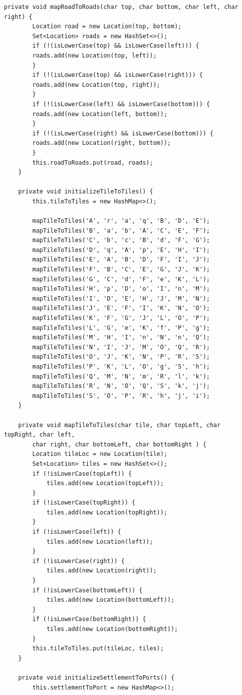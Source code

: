 \documentclass{fank1basedocument}
\begin{document}
\begin{lstlisting}[style=javacode,language=myJava]
	private void mapRoadToRoads(char top, char bottom, char left, char right) {
		Location road = new Location(top, bottom);
		Set<Location> roads = new HashSet<>();
		if (!(isLowerCase(top) && isLowerCase(left))) {
		roads.add(new Location(top, left));
		}
		if (!(isLowerCase(top) && isLowerCase(right))) {
		roads.add(new Location(top, right));
		}
		if (!(isLowerCase(left) && isLowerCase(bottom))) {
		roads.add(new Location(left, bottom));
		}
		if (!(isLowerCase(right) && isLowerCase(bottom))) {
		roads.add(new Location(right, bottom));
		}
		this.roadToRoads.put(road, roads);
	}
		
	private void initializeTileToTiles() {
		this.tileToTiles = new HashMap<>();

		mapTileToTiles('A', 'r', 'a', 'q', 'B', 'D', 'E');
		mapTileToTiles('B', 'a', 'b', 'A', 'C', 'E', 'F');
		mapTileToTiles('C', 'b', 'c', 'B', 'd', 'F', 'G');
		mapTileToTiles('D', 'q', 'A', 'p', 'E', 'H', 'I');
		mapTileToTiles('E', 'A', 'B', 'D', 'F', 'I', 'J');
		mapTileToTiles('F', 'B', 'C', 'E', 'G', 'J', 'K');
		mapTileToTiles('G', 'C', 'd', 'F', 'e', 'K', 'L');
		mapTileToTiles('H', 'p', 'D', 'o', 'I', 'n', 'M');
		mapTileToTiles('I', 'D', 'E', 'H', 'J', 'M', 'N');
		mapTileToTiles('J', 'E', 'F', 'I', 'K', 'N', 'O');
		mapTileToTiles('K', 'F', 'G', 'J', 'L', 'O', 'P');
		mapTileToTiles('L', 'G', 'e', 'K', 'f', 'P', 'g');
		mapTileToTiles('M', 'H', 'I', 'n', 'N', 'n', 'Q');
		mapTileToTiles('N', 'I', 'J', 'M', 'O', 'Q', 'R');
		mapTileToTiles('O', 'J', 'K', 'N', 'P', 'R', 'S');
		mapTileToTiles('P', 'K', 'L', 'O', 'g', 'S', 'h');
		mapTileToTiles('Q', 'M', 'N', 'm', 'R', 'l', 'k');
		mapTileToTiles('R', 'N', 'O', 'Q', 'S', 'k', 'j');
		mapTileToTiles('S', 'O', 'P', 'R', 'h', 'j', 'i');
	}

	private void mapTileToTiles(char tile, char topLeft, char topRight, char left,
		char right, char bottomLeft, char bottomRight ) {
		Location tileLoc = new Location(tile);
		Set<Location> tiles = new HashSet<>();
		if (!isLowerCase(topLeft)) {
			tiles.add(new Location(topLeft));
		}
		if (!isLowerCase(topRight)) {
			tiles.add(new Location(topRight));
		}
		if (!isLowerCase(left)) {
			tiles.add(new Location(left));
		}
		if (!isLowerCase(right)) {
			tiles.add(new Location(right));
		}
		if (!isLowerCase(bottomLeft)) {
			tiles.add(new Location(bottomLeft));
		}
		if (!isLowerCase(bottomRight)) {
			tiles.add(new Location(bottomRight));
		}
		this.tileToTiles.put(tileLoc, tiles);
	}

	private void initializeSettlementToPorts() {
		this.settlementToPort = new HashMap<>();


\end{lstlisting}
\end{document}
